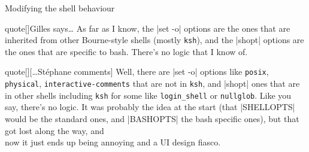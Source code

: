 \begin{frame}{Modifying the shell behaviour}
\begin{onlyenv}
\begin{varblock}{quote}[\textwidth]{Gilles says\ldots}
            \footnotesize
            As far as I know, the \textnormal{\bash|set -o|} options are the ones that are inherited from other Bourne-style shells (mostly \textnormal{\texttt{ksh}}), and the \textnormal{\bash|shopt|} options are the ones that are specific to bash.
            \alert{There's no logic that I know of.}
        \end{varblock}
        \vspace{-2mm}
        \begin{varblock}{quote}[\textwidth]{}[\ldots{}St\'ephane comments]
            \footnotesize
            Well, there are \textnormal{\bash|set -o|}  options like \textnormal{\texttt{posix}}, \textnormal{\texttt{physical}}, \textnormal{\texttt{interactive-comments}} that are not in \textnormal{\texttt{ksh}}, and \textnormal{\bash|shopt|} ones that are in other shells including \textnormal{\texttt{ksh}} for some like \textnormal{\texttt{login\_shell}} or \textnormal{\texttt{nullglob}}.
            Like you say, there's no logic.
            It was probably the idea at the start (that \textnormal{\bash|SHELLOPTS|} would be the standard ones, and \textnormal{\bash|BASHOPTS|} the bash specific ones), but that got lost along the way, and\\
            \alert{now it just ends up being annoying and a UI design fiasco.}\\[-0.7em] ~
        \end{varblock}
    \end{onlyenv}
\end{frame}
